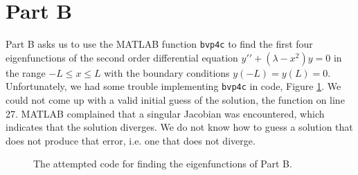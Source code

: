 \documentclass{article}
\begin{document}


\section*{Part B}

\qq Part B asks us to use the MATLAB function {\tt bvp4c} to find the first four
eigenfunctions of the second order differential equation
\(y\prime\prime + (\lambda - x^2) y = 0\) in the range \(-L \leq x \leq L\) with
the boundary conditions \(y(-L) = y(L) = 0\). Unfortunately, we had some trouble
implementing {\tt bvp4c} in code, Figure \ref{cod:partB}. We could not come up
with a valid initial guess of the solution, the function on line 27. MATLAB
complained that a singular Jacobian was encountered, which indicates that the
solution diverges. We do not know how to guess a solution that does not produce
that error, i.e. one that does not diverge.

\begin{figure}[H]
  \begin{center}
    
  \end{center}
  \caption{The attempted code for finding the eigenfunctions of Part B.}
  \label{cod:partB}
\end{figure}

\end{document}
